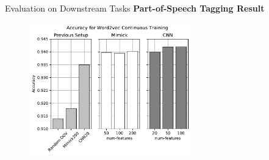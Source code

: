 \documentclass{beamer}
\begin{document}
\begin{frame}{Evaluation on Downstream Tasks}
    \textbf{Part-of-Speech Tagging Result}
    \begin{figure}[H]
        \centering
        \includegraphics[width=70mm]{images/continuous_word2vec}
    \end{figure}
\end{frame}
\end{document}
